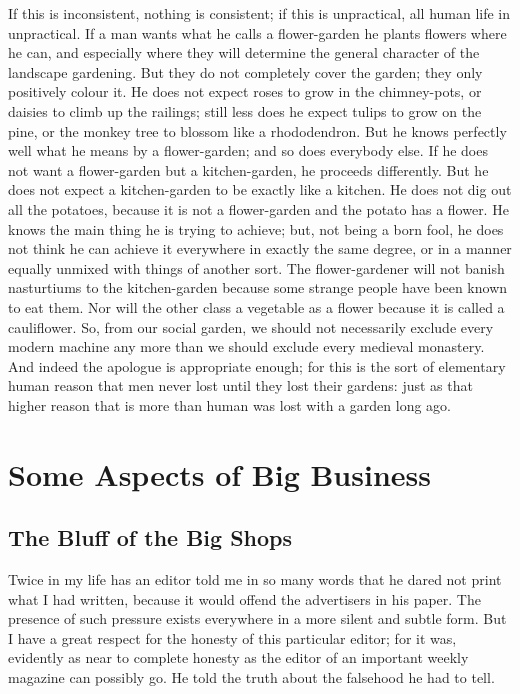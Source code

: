 \documentclass{book}
\begin{document}
If this is inconsistent, nothing is consistent; if this is unpractical, all human life in unpractical. If a man wants what he calls a flower-garden he plants flowers where he can, and especially where they will determine the general character of the landscape gardening. But they do not completely cover the garden; they only positively colour it. He does not expect roses to grow in the chimney-pots, or daisies to climb up the railings; still less does he expect tulips to grow on the pine, or the monkey tree to blossom like a rhododendron. But he knows perfectly well what he means by a flower-garden; and so does everybody else. If he does not want a flower-garden but a kitchen-garden, he proceeds differently. But he does not expect a kitchen-garden to be exactly like a kitchen. He does not dig out all the potatoes, because it is not a flower-garden and the potato has a flower. He knows the main thing he is trying to achieve; but, not being a born fool, he does not think he can achieve it everywhere in exactly the same degree, or in a manner equally unmixed with things of another sort. The flower-gardener will not banish nasturtiums to the kitchen-garden because some strange people have been known to eat them. Nor will the other class a vegetable as a flower because it is called a cauliflower. So, from our social garden, we should not necessarily exclude every modern machine any more than we should exclude every medieval monastery. And indeed the apologue is appropriate enough; for this is the sort of elementary human reason that men never lost until they lost their gardens: just as that higher reason that is more than human was lost with a garden long ago.

\setcounter{chapter}{0}\part{Some Aspects of Big Business}
\label{chapter-5}
\chapter{The Bluff of the Big Shops}
\label{chapter-6}
Twice in my life has an editor told me in so many words that he dared not print what I had written, because it would offend the advertisers in his paper. The presence of such pressure exists everywhere in a more silent and subtle form. But I have a great respect for the honesty of this particular editor; for it was, evidently as near to complete honesty as the editor of an important weekly magazine can possibly go. He told the truth about the falsehood he had to tell.
\end{document}
